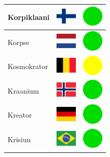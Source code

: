 \documentclass[12pt, a4paper, twoside]{report}
\begin{document}
\begin{center}
\begin{longtable}{|p{5cm}|p{2cm}|p{2cm}|}
 Korpiklaani                                                & \includegraphics[width=1cm]{../4x3/fi} &   \includegraphics[width=1cm]{../likes/y} \\ \hline
 Korpse                                                     & \includegraphics[width=1cm]{../4x3/nl} &   \includegraphics[width=1cm]{../likes/y} \\ \hline
 Kosmokrator                                                & \includegraphics[width=1cm]{../4x3/be} &   \includegraphics[width=1cm]{../likes/m} \\ \hline
 Kraanium                                                   & \includegraphics[width=1cm]{../4x3/no} &   \includegraphics[width=1cm]{../likes/y} \\ \hline
 Kreator                                                    & \includegraphics[width=1cm]{../4x3/de} &   \includegraphics[width=1cm]{../likes/y} \\ \hline
 Krisiun                                                    & \includegraphics[width=1cm]{../4x3/br} &   \includegraphics[width=1cm]{../likes/y} \\ \hline

\end{longtable}
\end{center}
\end{document}
